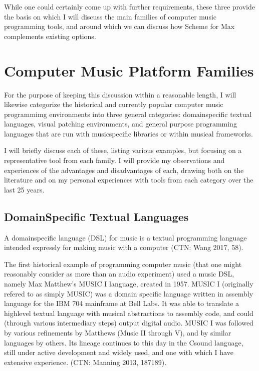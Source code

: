 \documentclass[letterpaper,10pt,english]{sphinxmanual}
\begin{document}
\sphinxAtStartPar
While one could certainly come up with further requirements, these three provide the basis
on which I will discuss the main families of computer music programming tools, and
around which we can discuss how Scheme for Max complements existing options.


\section{Computer Music Platform Families}
\label{\detokenize{background:computer-music-platform-families}}
\sphinxAtStartPar
For the purpose of keeping this discussion within a reasonable length,
I will likewise categorize the historical and currently popular computer music programmimg
environments into three general categories: domain\sphinxhyphen{}specific textual languages, visual patching
environments, and general purpose programming languages that are run with music\sphinxhyphen{}specific libraries
or within musical frameworks.

\sphinxAtStartPar
I will briefly discuss each of these, listing various examples, but focusing on a representative tool from each family.
I will provide my observations and experiences of the advantages and disadvantages of each,
drawing both on the literature and on my personal experiences with tools from each category
over the last 25 years.


\subsection{Domain\sphinxhyphen{}Specific Textual Languages}
\label{\detokenize{background:domain-specific-textual-languages}}
\sphinxAtStartPar
A domain\sphinxhyphen{}specific language (DSL) for music is a textual programming language intended
expressly for making music with a computer (CTN: Wang 2017, 58).

\sphinxAtStartPar
The first historical example of programming computer music (that one might reasonably
consider as more than an audio experiment) used a music DSL, namely Max Matthew’s MUSIC I
language, created in 1957.
MUSIC I (originally refered to as simply MUSIC) was a domain specific language written in assembly
language for the IBM 704 mainframe at Bell Labs.
It was able to translate a high\sphinxhyphen{}level textual language with musical abstractions to assembly code,
and could (through various intermediary steps) output digital audio.
MUSIC I was followed by various refinements by Matthews (Music II through V),
and by similar languages by others.
Its lineage continues to this day in the Csound language, still under active development and widely used,
and one with which I have extensive experience. (CTN: Manning 2013, 187\sphinxhyphen{}189).
\end{document}
